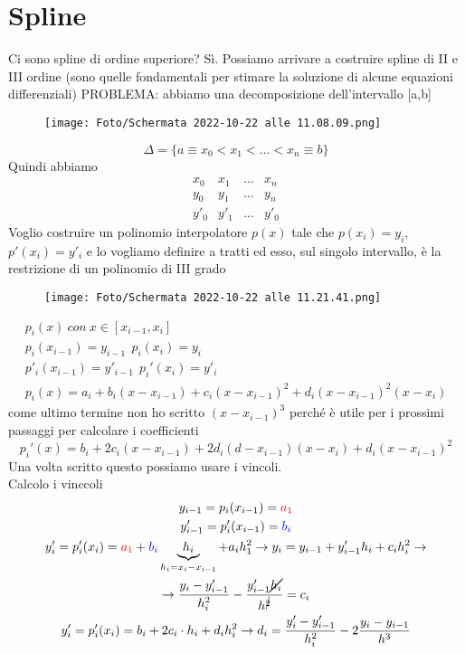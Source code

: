 \documentclass[a4paper, portrait]{book}
\numberwithin{equation}{chapter} %
\begin{document}
\section*{Spline}
Ci sono spline di ordine superiore? Sì. Possiamo arrivare a costruire spline di II e III ordine (sono quelle fondamentali per stimare la soluzione di alcune equazioni differenziali)
PROBLEMA: abbiamo una decomposizione dell'intervallo [a,b]
\begin{figure}[h!]
    \centering
    \texttt{[image: Foto/Schermata 2022-10-22 alle 11.08.09.png]}
    \caption{}
\end{figure}
\begin{equation}
    \Delta = \{a \equiv x_0 < x_1 < ... < x_n \equiv b\}
\end{equation}
Quindi abbiamo 
$$\begin{matrix}
    x_0&x_1&...&x_n\\
    y_0&y_1&...&y_n\\
    y'_0&y'_1&...&y'_0
\end{matrix}$$
Voglio costruire un polinomio interpolatore $p(x)$ tale che $p(x_i) = y_i$, $p'(x_i) = y'_i$ e lo vogliamo definire a tratti ed esso, sul singolo intervallo, è la restrizione di un polinomio di III grado
\begin{figure}[h!]
    \centering
    \texttt{[image: Foto/Schermata 2022-10-22 alle 11.21.41.png]}
    \caption{}
\end{figure}
\begin{gather}
    p_i(x) \ con \ x \in [x_{i-1},x_i]\\
    p_i(x_{i-1}) = y_{i-1} \ \ p_i(x_i) = y_i\\
    p'_i(x_{i-1}) = y'_{i-1} \ \ p_i'(x_i) = y'_i\\
    p_i(x) = a_i + b_i (x-x_{i-1}) + c_i (x-x_{i-1})^2 + d_i (x-x_{i-1})^2(x-x_i)
\end{gather}
come ultimo termine non ho scritto $(x-x_{i-1})^3$ perché è utile per i prossimi passaggi per calcolare i coefficienti
\begin{equation}
    p_i'(x) = b_i + 2c_i (x-x_{i-1}) + 2 d_i (d-x_{i-1})(x-x_i) + d_i (x-x_{i-1})^2
\end{equation}
Una volta scritto questo possiamo usare i vincoli.\\
Calcolo i vinccoli
\begin{gather}
    y_{i-1} = p_i (x_{i-1}) = \color{red}{a_1}\\
    y_{i-1}' = p_i'(x_{i-1}) = \color{blue}{b_i}\\
    y'_i = p'_i (x_i) = {\color{red}{a_1}} + {\color{blue}{b_i}} \underbrace{h_i}_{h_i = x_i - x_{i-1}} + a_i h_1^2 \rightarrow y_i = y_{i-1} + y'_{i-1} h_i + c_i h_i^2 \rightarrow\\
    \rightarrow \frac{y_i - y'_{i-1}}{h_i^2} - \frac{y'_{i-1}\cancel{h_i}}{h^{\cancel{2}}} = c_i\\
    y_i' = p_i'(x_i) = b_i + 2c_i \cdot h_i + d_i h_i^2 \rightarrow d_i = \frac{y_i' - y'_{i-1}}{h_i^2}- 2 \frac{y_i - y_{i-1}}{h^3}
\end{gather}
\end{document}
